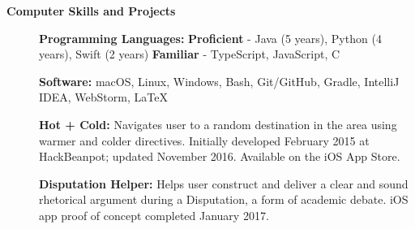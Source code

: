 \documentclass[letterpaper,10.6pt]{article}
\newcommand{\resheading}[1]{{\large \colorbox{mygrey}{\begin{minipage}{\textwidth}{\textbf{#1 \vphantom{p\^{E}}}}\end{minipage}}}}
\begin{document}
\resheading{Computer Skills and Projects}
{\small
\begin{description}
	\item[] \hspace{0.03in} \textbf{Programming Languages:} {\footnotesize \textbf{Proficient} - Java (5 years), Python (4 years), Swift (2 years) \enspace \textbf{Familiar} - TypeScript, JavaScript, C}
	\item[] \hspace{0.03in} \textbf{Software:} {\footnotesize macOS, Linux, Windows, Bash, Git/GitHub, Gradle, IntelliJ IDEA, WebStorm, \LaTeX}
	\item[] \hspace{0.03in} \textbf{Hot + Cold:} {\footnotesize Navigates user to a random destination in the area using warmer and colder directives. Initially developed February 2015 at HackBeanpot; updated November 2016. Available on the iOS App Store.}
	\item[] \hspace{0.03in} \textbf{Disputation Helper:} {\footnotesize Helps user construct and deliver a clear and sound rhetorical argument during a Disputation, a form of academic debate. iOS app proof of concept completed January 2017.}
	
\end{description}}
\end{document}
